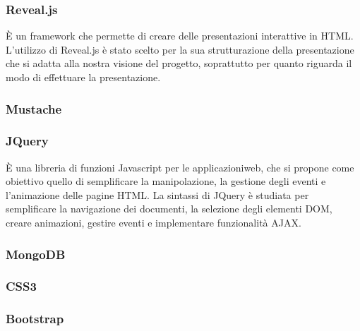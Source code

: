 \subsubsection{Reveal.js}
È un framework che permette di creare delle presentazioni interattive in HTML.
L'utilizzo di Reveal.js è stato scelto per la sua strutturazione della presentazione che si adatta alla nostra visione del progetto, soprattutto per quanto riguarda il modo di effettuare la presentazione.

\subsubsection{Mustache}

\subsubsection{JQuery}
È una libreria di funzioni Javascript per le applicazioniweb, che si propone come obiettivo quello di semplificare la manipolazione, la gestione degli eventi e l'animazione delle pagine HTML. La sintassi di JQuery è studiata per semplificare la navigazione dei documenti, la selezione degli elementi DOM, creare animazioni, gestire eventi e implementare funzionalità AJAX.

\subsubsection{MongoDB}

\subsubsection{CSS3}

\subsubsection{Bootstrap}